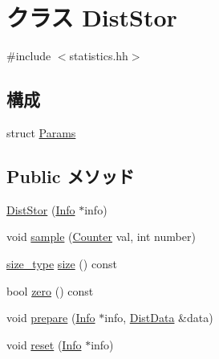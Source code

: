 \hypertarget{classStats_1_1DistStor}{
\section{クラス DistStor}
\label{classStats_1_1DistStor}
}


{\ttfamily \#include $<$statistics.hh$>$}\subsection*{構成}
\begin{DoxyCompactItemize}
\item 
struct \hyperlink{structStats_1_1DistStor_1_1Params}{Params}
\end{DoxyCompactItemize}
\subsection*{Public メソッド}
\begin{DoxyCompactItemize}
\item 
\hyperlink{classStats_1_1DistStor_a38de6f559415738e1cc7bb30ecaaba97}{DistStor} (\hyperlink{classStats_1_1Info}{Info} $\ast$info)
\item 
void \hyperlink{classStats_1_1DistStor_a57fea70de4ed8fee9ec9e9d9cca6f9fa}{sample} (\hyperlink{namespaceStats_ac35128c026c72bb36af9cea00774e8a6}{Counter} val, int number)
\item 
\hyperlink{namespaceStats_ada51e68d31936547d3729c82daf6b7c6}{size\_\-type} \hyperlink{classStats_1_1DistStor_a503ab01f6c0142145d3434f6924714e7}{size} () const 
\item 
bool \hyperlink{classStats_1_1DistStor_a4e72b01b727d3165e75cba84eb507491}{zero} () const 
\item 
void \hyperlink{classStats_1_1DistStor_a2e5e3cd36b4a3d6ab774aed4e3fcd641}{prepare} (\hyperlink{classStats_1_1Info}{Info} $\ast$info, \hyperlink{structStats_1_1DistData}{DistData} \&data)
\item 
void \hyperlink{classStats_1_1DistStor_a10d9d71be6e0d2194999bb5dd5280e2d}{reset} (\hyperlink{classStats_1_1Info}{Info} $\ast$info)
\end{DoxyCompactItemize}

